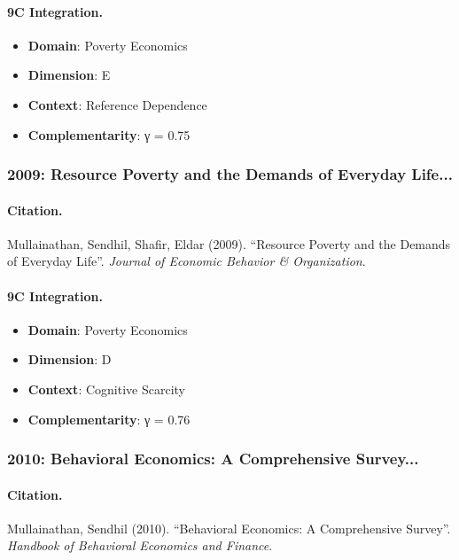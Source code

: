 \paragraph{9C Integration.}
\begin{itemize}[nosep]
  \item \textbf{Domain}: Poverty Economics
  \item \textbf{Dimension}: E
  \item \textbf{Context}: Reference Dependence
  \item \textbf{Complementarity}: γ = 0.75
\end{itemize}


\subsubsection{2009: Resource Poverty and the Demands of Everyday Life...}

\paragraph{Citation.}
Mullainathan, Sendhil, Shafir, Eldar (2009). ``Resource Poverty and the Demands of Everyday Life''. \textit{Journal of Economic Behavior & Organization}.

\paragraph{9C Integration.}
\begin{itemize}[nosep]
  \item \textbf{Domain}: Poverty Economics
  \item \textbf{Dimension}: D
  \item \textbf{Context}: Cognitive Scarcity
  \item \textbf{Complementarity}: γ = 0.76
\end{itemize}


\subsubsection{2010: Behavioral Economics: A Comprehensive Survey...}

\paragraph{Citation.}
Mullainathan, Sendhil (2010). ``Behavioral Economics: A Comprehensive Survey''. \textit{Handbook of Behavioral Economics and Finance}.

